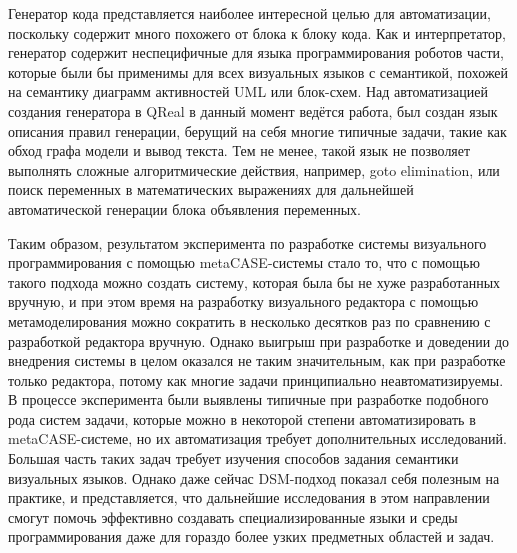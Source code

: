 \documentclass[a4paper]{article}
\begin{document}
Генератор кода представляется наиболее интересной целью для автоматизации, поскольку содержит много похожего от блока к блоку кода. Как и интерпретатор, генератор содержит неспецифичные для языка программирования роботов части, которые были бы применимы для всех визуальных языков с семантикой, похожей на семантику диаграмм активностей UML или блок-схем. Над автоматизацией создания генератора в QReal в данный момент ведётся работа, был создан язык описания правил генерации, берущий на себя многие типичные задачи, такие как обход графа модели и вывод текста. Тем не менее, такой язык не позволяет выполнять сложные алгоритмические действия, например, goto elimination, или поиск переменных в математических выражениях для дальнейшей автоматической генерации блока объявления переменных.

Таким образом, результатом эксперимента по разработке системы визуального программирования с помощью metaCASE-системы стало то, что с помощью такого подхода можно создать систему, которая была бы не хуже разработанных вручную, и при этом время на разработку визуального редактора с помощью метамоделирования можно сократить в несколько десятков раз по сравнению с разработкой редактора вручную. Однако выигрыш при разработке и доведении до внедрения системы в целом оказался не таким значительным, как при разработке только редактора, потому как многие задачи принципиально неавтоматизируемы. В процессе эксперимента были выявлены типичные при разработке подобного рода систем задачи, которые можно в некоторой степени автоматизировать в metaCASE-системе, но их автоматизация требует дополнительных исследований. Большая часть таких задач требует изучения способов задания семантики визуальных языков. Однако даже сейчас DSM-подход показал себя полезным на практике, и представляется, что дальнейшие исследования в этом направлении смогут помочь эффективно создавать специализированные языки и среды программирования даже для гораздо более узких предметных областей и задач.
\end{document}
